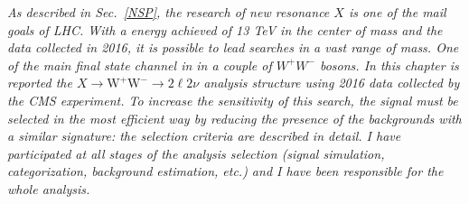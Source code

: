 
\textit{As described in Sec.~\ref{NSP}, the research of  new resonance $X$ is one of the mail goals of LHC. With a energy achieved of 13 TeV in the center of mass and the data collected in 2016, it is possible to lead searches in a vast range of mass. One of the main final state channel in in a couple of $W^+W^-$ bosons.
 In this chapter  is reported the $X \to \mathrm{W^+W^-}\to2\ell2\nu$ analysis structure using 2016 data collected by the CMS experiment. To increase the sensitivity of this search, the signal must be selected in the most efficient way by reducing the
presence of the backgrounds with a similar signature: the selection criteria are described in detail. I have participated at all stages of the analysis selection
 (signal simulation, categorization, background estimation, etc.)  and I have been responsible for the whole analysis.} 

